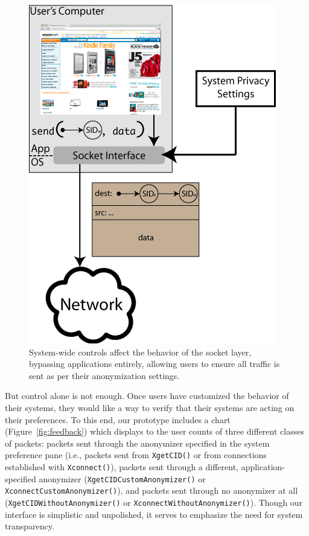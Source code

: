 \documentclass{article}
\begin{document}
\begin{figure}
\centering
\includegraphics[scale=0.5]{images/socket-control.png}
\caption{System-wide controls affect the behavior of the socket layer, bypassing applications entirely, allowing users to ensure all traffic is sent as per their anonymization settings.}
\label{fig:socket-control}
\end{figure}

But control alone is not enough. Once users have customized the behavior of their systems, they would like a way to verify that their systems are acting on their preferences. To this end, our prototype includes a chart (Figure~\ref{fig:feedback}) which displays to the user counts of three different classes of packets: packets sent through the anonymizer specified in the system preference pane (i.e., packets sent from \texttt{XgetCID()} or from connections established with \texttt{Xconnect()}), packets sent through a different, application-specified anonymizer (\texttt{XgetCIDCustomAnonymizer()} or \texttt{XconnectCustomAnonymizer()}), and packets sent through no anonymizer at all (\texttt{XgetCIDWithoutAnonymizer()} or \texttt{XconnectWithoutAnonymizer()}). Though our interface is simplistic and unpolished, it serves to emphasize the need for system transparency.
\end{document}
